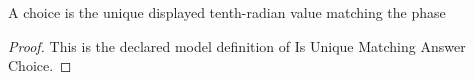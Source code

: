 \begin{definition}
  \label{def:physics:phyx-mini-0302:phyxminiproblems-problemphyxmini0302-isuniquematchinganswerchoice}
  A choice is the unique displayed tenth-radian value matching the phase
\end{definition}
\begin{proof}
  This is the declared model definition of Is Unique Matching Answer Choice.
\end{proof}
